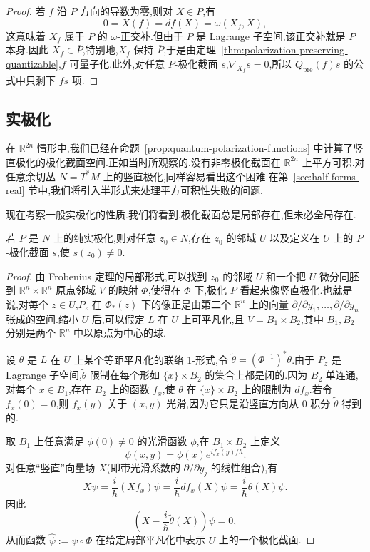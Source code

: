 \begin{proof}
若 $f$ 沿 $\overline P$ 方向的导数为零,则对 $X\in\overline P$,有
\[
 0=X(f)=df(X)=\omega(X_f,X),
\]
这意味着 $X_f$ 属于 $\overline P$ 的 $\omega$-正交补.但由于 $\overline P$ 是 Lagrange 子空间,该正交补就是 $\overline P$ 本身.因此 $X_f\in\overline P$,特别地,$X_f$ 保持 $\overline P$,于是由定理~\ref{thm:polarization-preserving-quantizable},$f$ 可量子化.此外,对任意 $P$-极化截面 $s$,$\nabla_{X_f}s=0$,所以 $Q_{\mathrm{pre}}(f)s$ 的公式中只剩下 $fs$ 项.
\end{proof}

\subsection{实极化}
\label{subsec:real-polarizations}

在 $\mathbb R^{2n}$ 情形中,我们已经在命题~\ref{prop:quantum-polarization-functions} 中计算了竖直极化的极化截面空间.正如当时所观察的,没有非零极化截面在 $\mathbb R^{2n}$ 上平方可积.对任意余切丛 $N=T^*M$ 上的竖直极化,同样容易看出这个困难.在第~\ref{sec:half-forms-real} 节中,我们将引入半形式来处理平方可积性失败的问题.

现在考察一般实极化的性质.我们将看到,极化截面总是局部存在,但未必全局存在.

\begin{proposition}[实极化截面的局部存在性]
\label{prop:local-real-polarized-section}
若 $P$ 是 $N$ 上的纯实极化,则对任意 $z_0\in N$,存在 $z_0$ 的邻域 $U$ 以及定义在 $U$ 上的 $P$-极化截面 $s$,使 $s(z_0)\ne0$.
\end{proposition}

\begin{proof}
由 Frobenius 定理的局部形式,可以找到 $z_0$ 的邻域 $U$ 和一个把 $U$ 微分同胚到 $\mathbb R^n\times\mathbb R^n$ 原点邻域 $V$ 的映射 $\Phi$,使得在 $\Phi$ 下,极化 $P$ 看起来像竖直极化.也就是说,对每个 $z\in U$,$P_z$ 在 $\Phi_*(z)$ 下的像正是由第二个 $\mathbb R^n$ 上的向量 $\partial/\partial y_1,\ldots,\partial/\partial y_n$ 张成的空间.缩小 $U$ 后,可以假定 $L$ 在 $U$ 上可平凡化,且 $V=B_1\times B_2$,其中 $B_1,B_2$ 分别是两个 $\mathbb R^n$ 中以原点为中心的球.

设 $\theta$ 是 $L$ 在 $U$ 上某个等距平凡化的联络 1-形式,令 $\widetilde\theta=(\Phi^{-1})^*\theta$.由于 $P_z$ 是 Lagrange 子空间,$\widetilde\theta$ 限制在每个形如 $\{x\}\times B_2$ 的集合上都是闭的.因为 $B_2$ 单连通,对每个 $x\in B_1$,存在 $B_2$ 上的函数 $f_x$,使 $\widetilde\theta$ 在 $\{x\}\times B_2$ 上的限制为 $df_x$.若令 $f_x(0)=0$,则 $f_x(y)$ 关于 $(x,y)$ 光滑,因为它只是沿竖直方向从 0 积分 $\widetilde\theta$ 得到的.

取 $B_1$ 上任意满足 $\phi(0)\ne0$ 的光滑函数 $\phi$,在 $B_1\times B_2$ 上定义
\[
 \psi(x,y)=\phi(x)e^{if_x(y)/\hbar}.
\]
对任意“竖直”向量场 $X$(即带光滑系数的 $\partial/\partial y_j$ 的线性组合),有
\[
 X\psi=\frac{i}{\hbar}(Xf_x)\psi
 =\frac{i}{\hbar}d f_x(X)\psi
 =\frac{i}{\hbar}\widetilde\theta(X)\psi.
\]
因此
\[
 \left(X-\frac{i}{\hbar}\widetilde\theta(X)\right)\psi=0,
\]
从而函数 $\widehat\psi:=\psi\circ\Phi$ 在给定局部平凡化中表示 $U$ 上的一个极化截面.
\end{proof}

